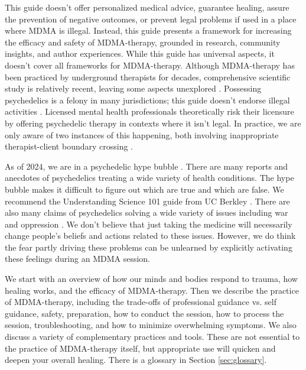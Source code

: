 \documentclass[12pt,letterpaper]{article}
\begin{document}
This guide doesn't offer personalized medical advice, guarantee healing, assure the prevention of negative outcomes, or prevent legal problems if used in a place where MDMA is illegal. Instead, this guide presents a framework for increasing the efficacy and safety of MDMA-therapy, grounded in research, community insights, and author experiences. While this guide has universal aspects, it doesn't cover all frameworks for MDMA-therapy. Although MDMA-therapy has been practiced by underground therapists for decades, comprehensive scientific study is relatively recent, leaving some aspects unexplored \cite{passieHistory}. Possessing psychedelics is a felony in many jurisdictions; this guide doesn't endorse illegal activities \cite{alphaLegalization}. Licensed mental health professionals theoretically risk their licensure by offering psychedelic therapy in contexts where it isn't legal. In practice, we are only aware of two instances of this happening, both involving inappropriate therapist-client boundary crossing \cite{sessa2015underground,lindsayLicense}.

As of 2024, we are in a psychedelic hype bubble \cite{yaden2022preparing}. There are many reports and anecdotes of psychedelics treating a wide variety of health conditions. The hype bubble makes it difficult to figure out which are true and which are false. We recommend the Understanding Science 101 guide from UC Berkley \cite{understandingScience}. There are also many claims of psychedelics solving a wide variety of issues including war and oppression \cite{yaden2022preparing}. We don't believe that just taking the medicine will necessarily change people's beliefs and actions related to these issues. However, we do think the fear partly driving these problems can be unlearned by explicitly activating these feelings during an MDMA session.

We start with an overview of how our minds and bodies respond to trauma, how healing works, and the efficacy of MDMA-therapy. Then we describe the practice of MDMA-therapy, including the trade-offs of professional guidance vs. self guidance, safety, preparation, how to conduct the session, how to process the session, troubleshooting, and how to minimize overwhelming symptoms. We also discuss a variety of complementary practices and tools. These are not essential to the practice of MDMA-therapy itself, but appropriate use will quicken and deepen your overall healing. There is a glossary in Section \ref{sec:glossary}.
\end{document}
